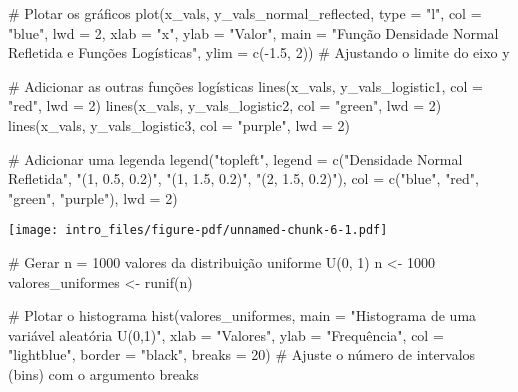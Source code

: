 \documentclass[
  letterpaper,
  DIV=11,
  numbers=noendperiod]{scrreprt}
\newenvironment{Shaded}{\begin{snugshade}}{\end{snugshade}}
\newcommand{\AttributeTok}[1]{\textcolor[rgb]{0.40,0.45,0.13}{#1}}
\newcommand{\CommentTok}[1]{\textcolor[rgb]{0.37,0.37,0.37}{#1}}
\newcommand{\DecValTok}[1]{\textcolor[rgb]{0.68,0.00,0.00}{#1}}
\newcommand{\FloatTok}[1]{\textcolor[rgb]{0.68,0.00,0.00}{#1}}
\newcommand{\FunctionTok}[1]{\textcolor[rgb]{0.28,0.35,0.67}{#1}}
\newcommand{\NormalTok}[1]{\textcolor[rgb]{0.00,0.23,0.31}{#1}}
\newcommand{\OtherTok}[1]{\textcolor[rgb]{0.00,0.23,0.31}{#1}}
\newcommand{\SpecialCharTok}[1]{\textcolor[rgb]{0.37,0.37,0.37}{#1}}
\newcommand{\StringTok}[1]{\textcolor[rgb]{0.13,0.47,0.30}{#1}}
\begin{document}
\begin{Shaded}
\begin{Highlighting}[]
\CommentTok{\# Plotar os gráficos}
\FunctionTok{plot}\NormalTok{(x\_vals, y\_vals\_normal\_reflected, }\AttributeTok{type =} \StringTok{"l"}\NormalTok{, }\AttributeTok{col =} \StringTok{"blue"}\NormalTok{, }\AttributeTok{lwd =} \DecValTok{2}\NormalTok{,}
     \AttributeTok{xlab =} \StringTok{"x"}\NormalTok{, }\AttributeTok{ylab =} \StringTok{"Valor"}\NormalTok{, }\AttributeTok{main =} \StringTok{"Função Densidade Normal Refletida e Funções Logísticas"}\NormalTok{, }
     \AttributeTok{ylim =} \FunctionTok{c}\NormalTok{(}\SpecialCharTok{{-}}\FloatTok{1.5}\NormalTok{, }\DecValTok{2}\NormalTok{)) }\CommentTok{\# Ajustando o limite do eixo y}

\CommentTok{\# Adicionar as outras funções logísticas}
\FunctionTok{lines}\NormalTok{(x\_vals, y\_vals\_logistic1, }\AttributeTok{col =} \StringTok{"red"}\NormalTok{, }\AttributeTok{lwd =} \DecValTok{2}\NormalTok{)}
\FunctionTok{lines}\NormalTok{(x\_vals, y\_vals\_logistic2, }\AttributeTok{col =} \StringTok{"green"}\NormalTok{, }\AttributeTok{lwd =} \DecValTok{2}\NormalTok{)}
\FunctionTok{lines}\NormalTok{(x\_vals, y\_vals\_logistic3, }\AttributeTok{col =} \StringTok{"purple"}\NormalTok{, }\AttributeTok{lwd =} \DecValTok{2}\NormalTok{)}

\CommentTok{\# Adicionar uma legenda}
\FunctionTok{legend}\NormalTok{(}\StringTok{"topleft"}\NormalTok{, }\AttributeTok{legend =} \FunctionTok{c}\NormalTok{(}\StringTok{"Densidade Normal Refletida"}\NormalTok{, }\StringTok{"(1, 0.5, 0.2)"}\NormalTok{, }\StringTok{"(1, 1.5, 0.2)"}\NormalTok{, }\StringTok{"(2, 1.5, 0.2)"}\NormalTok{),}
       \AttributeTok{col =} \FunctionTok{c}\NormalTok{(}\StringTok{"blue"}\NormalTok{, }\StringTok{"red"}\NormalTok{, }\StringTok{"green"}\NormalTok{, }\StringTok{"purple"}\NormalTok{), }\AttributeTok{lwd =} \DecValTok{2}\NormalTok{)}
\end{Highlighting}
\end{Shaded}

\texttt{[image: intro\_files/figure-pdf/unnamed-chunk-6-1.pdf]}

\begin{Shaded}
\begin{Highlighting}[]
\CommentTok{\# Gerar n = 1000 valores da distribuição uniforme U(0, 1)}
\NormalTok{n }\OtherTok{\textless{}{-}} \DecValTok{1000}
\NormalTok{valores\_uniformes }\OtherTok{\textless{}{-}} \FunctionTok{runif}\NormalTok{(n)}

\CommentTok{\# Plotar o histograma}
\FunctionTok{hist}\NormalTok{(valores\_uniformes, }\AttributeTok{main =} \StringTok{"Histograma de uma variável aleatória U(0,1)"}\NormalTok{, }
     \AttributeTok{xlab =} \StringTok{"Valores"}\NormalTok{, }\AttributeTok{ylab =} \StringTok{"Frequência"}\NormalTok{, }\AttributeTok{col =} \StringTok{"lightblue"}\NormalTok{, }\AttributeTok{border =} \StringTok{"black"}\NormalTok{, }
     \AttributeTok{breaks =} \DecValTok{20}\NormalTok{)  }\CommentTok{\# Ajuste o número de intervalos (bins) com o argumento \textquotesingle{}breaks\textquotesingle{}}
\end{Highlighting}
\end{Shaded}
\end{document}
